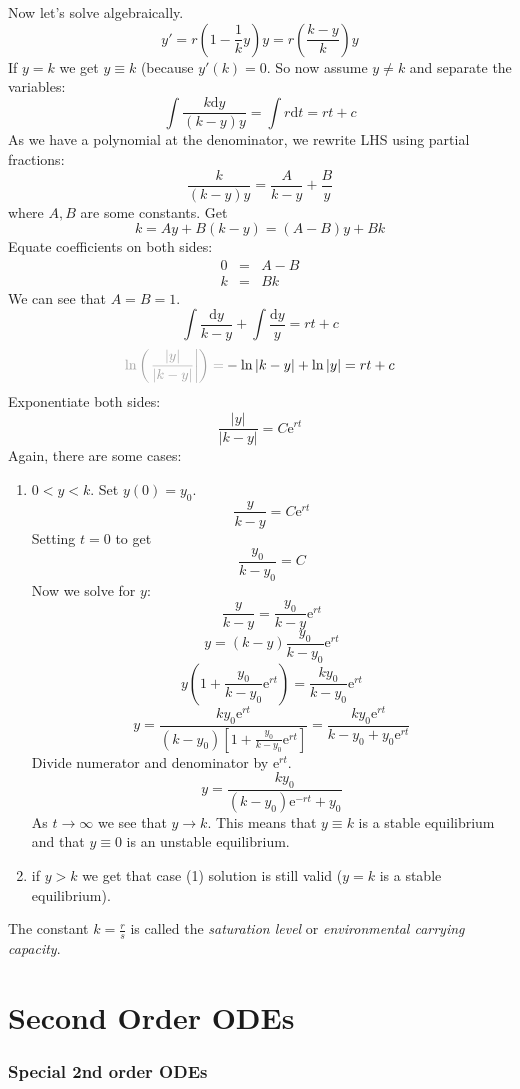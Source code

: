 \documentclass{article}
\newcommand{\mathd}{\mathrm{d}}
\newcommand{\mathe}{\mathrm{e}}
\newcommand{\tmem}[1]{{\em #1\/}}
\newenvironment{enumeratenumeric}{\begin{enumerate}[1.] }{\end{enumerate}}
\begin{document}
Now let's solve algebraically.
\[ y' = r \left( 1 - \frac{1}{k} y \right) y = r \left( \frac{k - y}{k}
   \right) y \]
If $y = k$ we get $y \equiv k$ (because $y' (k) = 0$. So now assume $y \neq k$
and separate the variables:
\[ \int \frac{k \mathd y}{(k - y) y} = \int r \mathd t = rt + c \]
As we have a polynomial at the denominator, we rewrite LHS using partial
fractions:
\[ \frac{k}{(k - y) y} = \frac{A}{k - y} + \frac{B}{y} \]
where $A, B$ are some constants. Get
\[ k = Ay + B (k - y) = (A - B) y + Bk \]
Equate coefficients on both sides:
\begin{eqnarray*}
  0 & = & A - B\\
  k & = & Bk
\end{eqnarray*}
We can see that $A = B = 1$.
\[ \int \frac{\mathd y}{k - y} + \int \frac{\mathd y}{y} = rt + c \]
\[ {\color[HTML]{A0A0A0}\ln \left( \left. \frac{| y |}{| k - y |} \right|
   \right) =} - \ln | k - y | + \ln | y | = rt + c \]
Exponentiate both sides:
\[ \frac{| y |}{| k - y |} = C \mathe^{rt} \]
Again, there are some cases:
\begin{enumeratenumeric}
  \item $0 < y < k$. Set $y (0) = y_0$.
  \[ \frac{y}{k - y} = C \mathe^{rt} \]
  Setting $t = 0$ to get
  \[ \frac{y_0}{k - y_0} = C \]
  Now we solve for $y$:
  \[ \frac{y}{k - y} = \frac{y_0}{k - y} \mathe^{rt} \]
  \[ y = (k - y)  \frac{y_0}{k - y_0} \mathe^{rt} \]
  \[ y \left( 1 + \frac{y_0}{k - y_0} \mathe^{rt} \right) = \frac{ky_0}{k -
     y_0} \mathe^{rt} \]
  \[ y = \frac{ky_0 \mathe^{rt}}{(k - y_0) \left[ 1 + \frac{y_0}{k - y_0}
     \mathe^{rt} \right]} = \frac{ky_0 \mathe^{rt}}{k - y_0 + y_0 \mathe^{rt}}
  \]
  Divide numerator and denominator by $\mathe^{rt}$.
  \[ y = \frac{ky_0}{(k - y_0) \mathe^{- rt} + y_0} \]
  As $t \rightarrow \infty$ we see that $y \rightarrow k$. This means that $y
  \equiv k$ is a stable equilibrium and that $y \equiv 0$ is an unstable
  equilibrium.
  
  \item if $y > k$ we get that case (1) solution is still valid ($y = k$ is a
  stable equilibrium).
\end{enumeratenumeric}
The constant $k = \frac{r}{s}$ is called the {\tmem{saturation level}} or
{\tmem{environmental carrying capacity}}.

\part{Second Order ODEs}

\section{Special 2nd order ODEs}
\end{document}
